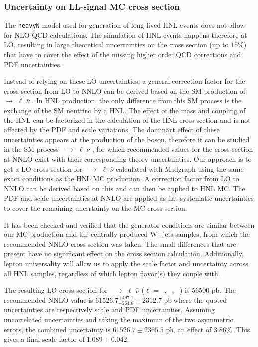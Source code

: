 \subsubsection{Uncertainty on LL-signal MC cross section}\label{sec:c4lo}
The \texttt{heavyN} model used for generation of long-lived HNL events does not allow for NLO QCD calculations. The simulation of HNL events happens therefore at LO, resulting in large theoretical uncertainties on the cross section (up to $15\%$) that have to cover the effect of the missing higher order QCD corrections and PDF uncertainties.

Instead of relying on these LO uncertainties, a general correction factor for the cross section from LO to NNLO can be derived based on the SM production of \PW\ $\rightarrow$ $\ell$ $\bar{\nu}$ . In HNL production, the only difference from this SM process is the exchange of the SM neutrino by a HNL. The effect of the mass and coupling of the HNL can be factorized in the calculation of the HNL cross section and is not affected by the PDF and scale variations. The dominant effect of these uncertainties appears at the production of the \PW boson, therefore it can be studied in the SM process \PW\ $\rightarrow$ $\ell$ $\bar{\nu}$ , for which recommended values for the cross section at NNLO exist with their corresponding theory uncertainties. Our approach is to get a LO cross section for \PW\ $\rightarrow$ $\ell$ $\bar{\nu}$ calculated with Madgraph using the same exact conditions as the HNL MC production. A correction factor from LO to NNLO can be derived based on this and can then be applied to HNL MC. The PDF and scale uncertainties at NNLO are applied as flat systematic uncertainties to cover the remaining uncertainty on the MC cross section.

It has been checked and verified that the generator conditions are similar between our MC production and the centrally produced W+jets samples, from which the recommended NNLO cross section was taken. The small differences that are present have no significant effect on the cross section calculation. Additionally, lepton universality will allow us to apply the scale factor and uncertainty across all HNL samples, regardless of which lepton flavor(s) they couple with.

The resulting LO cross section for \PW\ $\rightarrow$ $\ell$
$\bar{\nu}$ ($\ell$ = \Pe\ , \PGm\ , \PGt\ ) is 56500 pb. The recommended NNLO value is $61526.7^{+497.1}_{-264.6}\pm 2312.7$ pb where the quoted uncertainties are respectively scale and PDF uncertainties. Assuming uncorrelated uncertainties and taking the maximum of the two asymmetric errors, the combined uncertainty is $61526.7 \pm 2365.5$ pb, an effect of $3.86\%$. This gives a final scale factor of $1.089 \pm 0.042$.

